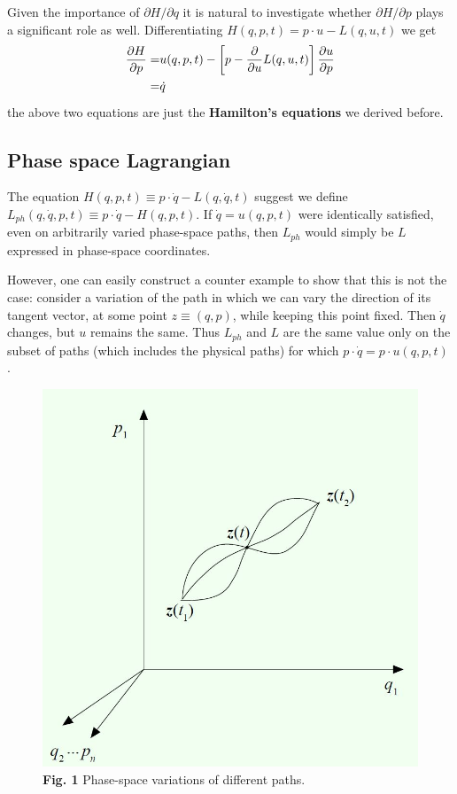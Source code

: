\documentclass[letterpaper,10pt,english]{sphinxmanual}
\begin{document}
Given the importance of \(\partial H/ \partial q\) it is natural to investigate whether \(\partial H/\partial p\) plays a significant role as well. Differentiating \(H(q, p, t)= p\cdot u − L(q,u, t)\) we get
\begin{gather}
\begin{split}\frac{\partial H}{\partial p}=&u(q,p,t)-\left[p-\frac{\partial}{\partial u}L(q,u,t)\right]\frac{\partial u}{\partial p} \\
=&\dot{q}\end{split}\notag
\end{gather}
the above two equations are just the \textbf{Hamilton's equations} we derived before.


\subsection{Phase space Lagrangian}
\label{CM/Lagrangian:id4}
The equation \(H(q,p,t)\equiv p\cdot\dot{q}-L(q,\dot{q},t)\) suggest we define \(L_{ph}(q,\dot{q},p,t)\equiv p\cdot\dot{q}-H(q,p,t)\). If \(\dot{q}=u(q,p,t)\) were identically satisfied, even on arbitrarily varied phase-space paths, then \(L_{ph}\) would simply be \(L\) expressed in phase-space coordinates.

However, one can easily construct a counter example to show that this is not the case: consider a variation of the path in which we can vary the direction of its tangent vector, at some point \(z\equiv (q, p)\), while keeping this
point fixed. Then \(\dot{q}\) changes, but \(u\) remains the same. Thus \(L_{ph}\) and \(L\) are the same value only on the subset of paths (which includes the physical paths) for which \(p\cdot\dot{q} = p\cdot u(q, p, t)\) .
\begin{figure}[htbp]
\centering
\capstart

\includegraphics[width=0.500\linewidth]{1.jpg}
\caption{\textbf{Fig. 1} Phase-space variations of different paths.}\end{figure}
\end{document}
